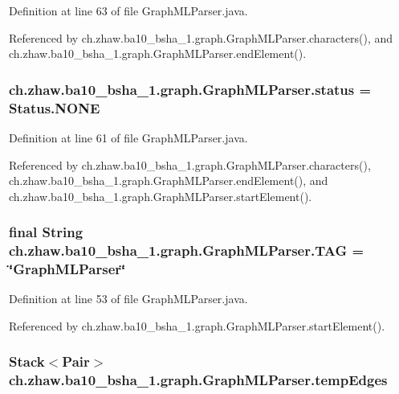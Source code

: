 Definition at line 63 of file GraphMLParser.java.

Referenced by ch.zhaw.ba10\_\-bsha\_\-1.graph.GraphMLParser.characters(), and ch.zhaw.ba10\_\-bsha\_\-1.graph.GraphMLParser.endElement().\hypertarget{classch_1_1zhaw_1_1ba10__bsha__1_1_1graph_1_1GraphMLParser_aad96857e9c5dd4c59f408b26937a0c72}{
\subsubsection[{status}]{ {\bf ch.zhaw.ba10\_\-bsha\_\-1.graph.GraphMLParser.status} = Status.NONE}}
\label{classch_1_1zhaw_1_1ba10__bsha__1_1_1graph_1_1GraphMLParser_aad96857e9c5dd4c59f408b26937a0c72}


Definition at line 61 of file GraphMLParser.java.

Referenced by ch.zhaw.ba10\_\-bsha\_\-1.graph.GraphMLParser.characters(), ch.zhaw.ba10\_\-bsha\_\-1.graph.GraphMLParser.endElement(), and ch.zhaw.ba10\_\-bsha\_\-1.graph.GraphMLParser.startElement().\hypertarget{classch_1_1zhaw_1_1ba10__bsha__1_1_1graph_1_1GraphMLParser_a7df7fc4703a593c56c984fef423b7973}{
\subsubsection[{TAG}]{\setlength{\rightskip}{0pt plus 5cm}final String {\bf ch.zhaw.ba10\_\-bsha\_\-1.graph.GraphMLParser.TAG} = \char`\"{}GraphMLParser\char`\"{}}}
\label{classch_1_1zhaw_1_1ba10__bsha__1_1_1graph_1_1GraphMLParser_a7df7fc4703a593c56c984fef423b7973}


Definition at line 53 of file GraphMLParser.java.

Referenced by ch.zhaw.ba10\_\-bsha\_\-1.graph.GraphMLParser.startElement().\hypertarget{classch_1_1zhaw_1_1ba10__bsha__1_1_1graph_1_1GraphMLParser_ac4f86507ba5f92c81a9d1736e50866a4}{
\subsubsection[{tempEdges}]{\setlength{\rightskip}{0pt plus 5cm}Stack$<${\bf Pair}$>$ {\bf ch.zhaw.ba10\_\-bsha\_\-1.graph.GraphMLParser.tempEdges}}}
\label{classch_1_1zhaw_1_1ba10__bsha__1_1_1graph_1_1GraphMLParser_ac4f86507ba5f92c81a9d1736e50866a4}


